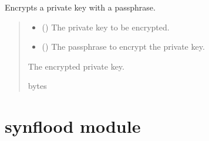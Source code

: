 \documentclass[letterpaper,10pt,english]{sphinxmanual}
\begin{document}
\begin{fulllineitems}
\label{\detokenize{server1:server1.encrypt_private_key}}
\pysigstartsignatures
{}
\pysigstopsignatures
\sphinxAtStartPar
Encrypts a private key with a passphrase.
\begin{quote}\begin{description}
\begin{itemize}
\item {} 
\sphinxAtStartPar
{} () \textendash{} The private key to be encrypted.

\item {} 
\sphinxAtStartPar
{} () \textendash{} The passphrase to encrypt the private key.

\end{itemize}

\sphinxAtStartPar
The encrypted private key.

\sphinxAtStartPar
bytes

\end{description}\end{quote}

\end{fulllineitems}


\sphinxstepscope


\section{synflood module}
\label{\detokenize{synflood:module-synflood}}\label{\detokenize{synflood:synflood-module}}\label{\detokenize{synflood::doc}}
\end{document}
